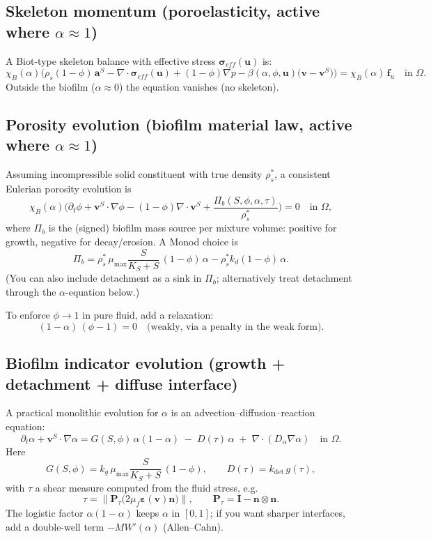 \documentclass[11pt]{article}
\newcommand{\I}{\bm{I}}
\newcommand{\n}{\bm{n}}
\newcommand{\grad}{\nabla}
\newcommand{\divv}{\nabla\!\cdot}
\newcommand{\eps}{\bm{\varepsilon}}
\newcommand{\Dt}{\partial_t}
\begin{document}
\subsection{Skeleton momentum (poroelasticity, active where $\alpha\approx 1$)}
A Biot-type skeleton balance with effective stress $\bm{\sigma}_{eff}(\bm{u})$ is:
\begin{equation}\label{eq:skeleton}
\chi_B(\alpha)\Big(
\rho_s(1-\phi)\,\bm{a}^S
-\divv \bm{\sigma}_{eff}(\bm{u})
+(1-\phi)\grad p
-\beta(\alpha,\phi,\bm{u})\big(\bm{v}-\bm{v}^S\big)
\Big)
= \chi_B(\alpha)\,\bm{f}_u
\quad \text{in }\Omega.
\end{equation}
Outside the biofilm ($\alpha\approx 0$) the equation vanishes (no skeleton).

\subsection{Porosity evolution (biofilm material law, active where $\alpha\approx 1$)}
Assuming incompressible solid constituent with true density $\rho_s^\ast$,
a consistent Eulerian porosity evolution is
\begin{equation}\label{eq:phi_evol}
\chi_B(\alpha)\Big(
\Dt\phi + \bm{v}^S\cdot\grad\phi - (1-\phi)\divv \bm{v}^S
+ \frac{\Pi_b(S,\phi,\alpha,\tau)}{\rho_s^\ast}
\Big)=0
\quad \text{in }\Omega,
\end{equation}
where $\Pi_b$ is the (signed) biofilm mass source per mixture volume:
positive for growth, negative for decay/erosion.
A Monod choice is
\[
\Pi_b = \rho_s^\ast\,\mu_{\max}\frac{S}{K_S+S}\,(1-\phi)\,\alpha - \rho_s^\ast k_d (1-\phi)\,\alpha.
\]
(You can also include detachment as a sink in $\Pi_b$; alternatively treat detachment through the $\alpha$-equation below.)

To enforce $\phi\to 1$ in pure fluid, add a relaxation:
\[
(1-\alpha)\,(\phi-1)=0
\quad\text{(weakly, via a penalty in the weak form)}.
\]

\subsection{Biofilm indicator evolution (growth + detachment + diffuse interface)}
A practical monolithic evolution for $\alpha$ is an advection--diffusion--reaction equation:
\begin{equation}\label{eq:alpha_evol}
\Dt \alpha + \bm{v}^S\cdot\grad\alpha
= G(S,\phi)\,\alpha(1-\alpha) \;-\; D(\tau)\,\alpha
\;+\; \divv(D_\alpha \grad\alpha)
\quad \text{in }\Omega.
\end{equation}
Here
\[
G(S,\phi)=k_g\,\mu_{\max}\frac{S}{K_S+S}\,(1-\phi),
\qquad
D(\tau)=k_{\det}\,g(\tau),
\]
with $\tau$ a shear measure computed from the fluid stress, e.g.
\[
\tau = \|\bm{P}_\tau\big(2\mu_f\eps(\bm{v})\n\big)\|,\qquad \bm{P}_\tau = \I - \n\otimes\n.
\]
The logistic factor $\alpha(1-\alpha)$ keeps $\alpha$ in $[0,1]$; if you want sharper interfaces, add a double-well term $-M W'(\alpha)$ (Allen--Cahn).
\end{document}
